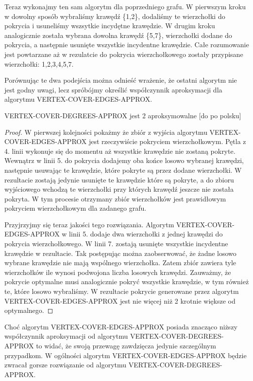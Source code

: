 

	Teraz wykonajmy ten sam algorytm dla poprzedniego grafu. W pierwszym kroku w dowolny sposób wybraliśmy krawędź \{1,2\}, dodaliśmy te wierzchołki do pokrycia i usuneliśmy wszsytkie incydętne krawędzie. W drugim kroku analogicznie została wybrana dowolna krawędź \{5,7\}, wierzchołki dodane do pokrycia, a następnie usunięte wszystkie incydentne krawędzie. Całe rozumowanie jest powtarzane aż w rezulatcie do pokrycia wierzchołkowego zostały przypisane wierzchołki: 1,2,3,4,5,7.



Porównując te dwa podejścia można odnieść wrażenie, że ostatni algorytm nie jest godny uwagi, lecz spróbójmy określić współczynnik aproksymacji dla algorytmu VERTEX-COVER-EDGES-APPROX.

\begin{twr}
VERTEX-COVER-DEGREES-APPROX jest 2 aproksymowalne [do po polsku]
\end{twr}

\begin{proof}
W pierwszej kolejności pokażmy że zbiór z wyjścia algorytmu VERTEX-COVER-EDGES-APPROX jest rzeczywiście pokryciem wierzchołkowym. Pętla z 4. linii wykonuje się do momentu aż wszystkie krawędzie nie zostaną pokryte. Wewnątrz w linii 5. do pokrycia dodajemy oba końce losowo wybranej krawędzi, następnie usuwając te krawędzie, które pokryte są przez dodane wierzchołki. W rezultacie zostają jedynie usunięte te krawędzie które są pokryte, a do zbioru wyjściowego wchodzą te wierzchołki przy których krawędź jeszcze nie została pokryta. W tym procesie otrzymany zbiór wierzchołków jest prawidłowym pokryciem wierzchołkowym dla zadanego grafu.

Przyjrzyjmy się teraz jakości tego rozwiązania. Algorytm VERTEX-COVER-EDGES-APPROX w linii 5. dodaje dwa wierzchołki z jednej krawędzi do pokrycia wierzchołkowego. W linii 7. zostają usunięte wszystkie incydentne krawędzie w rezultacie. Tak postępując można zaobserwować, że żadne losowo wybrane krawędzie nie mają wspólnego wierzchołka. Zatem zbiór zawiera tyle wierzchołków ile wynosi podwojona liczba losowych krawędzi. Zauważmy, że pokrycie optymalne musi analogicznie pokryć wszystkie krawędzie, w tym również te, które losowo wybraliśmy. W rezultacie pokrycie generowane przez algorytm VERTEX-COVER-EDGES-APPROX jest nie więcej niż 2 krotnie większe od optymalnego.
\end{proof}

Choć algorytm VERTEX-COVER-EDGES-APPROX posiada znacząco niższy współczynnik aproksymacji od algorytmu VERTEX-COVER-DEGREES-APPROX to widać, że swoją przewagę zawdzięcza jedynie szczególnym przypadkom. W ogólności algorytm VERTEX-COVER-EDGES-APPROX będzie zwracał gorsze rozwiązanie od algorytmu VERTEX-COVER-DEGREES-APPROX.